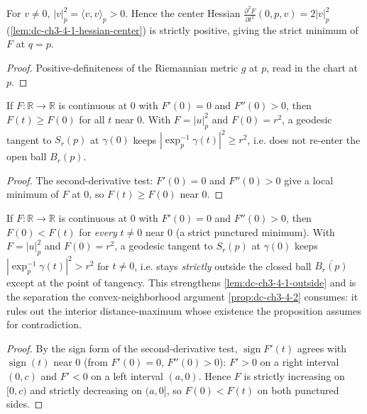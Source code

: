 \begin{lemma}
  \label{lem:dc-ch3-4-1-posdef}
  \leanok
  For $v\neq0$, $|v|_p^2=\langle v,v\rangle_p>0$. Hence the center Hessian
  $\frac{\partial^2 F}{\partial t^2}(0,p,v)=2|v|_p^2$
  (\cref{lem:dc-ch3-4-1-hessian-center}) is strictly positive, giving the
  strict minimum of $F$ at $q=p$.
\end{lemma}
\begin{proof}
  \sketch
  \leanok
  Positive-definiteness of the Riemannian metric $g$ at $p$, read in the chart
  at $p$.
\end{proof}

\begin{lemma}
  \label{lem:dc-ch3-4-1-outside}
  \leanok
  If $F:\mathbb{R}\to\mathbb{R}$ is continuous at $0$ with $F'(0)=0$ and
  $F''(0)>0$, then $F(t)\ge F(0)$ for all $t$ near $0$. With $F=|u|_p^2$ and
  $F(0)=r^2$, a geodesic tangent to $S_r(p)$ at $\gamma(0)$ keeps
  $|\exp_p^{-1}\gamma(t)|^2\ge r^2$, i.e. does not re-enter the open ball
  $B_r(p)$.
\end{lemma}
\begin{proof}
  \sketch
  \leanok
  The second-derivative test: $F'(0)=0$ and $F''(0)>0$ give a local minimum of
  $F$ at $0$, so $F(t)\ge F(0)$ near $0$.
\end{proof}

\begin{lemma}
  \label{lem:dc-ch3-4-1-strict-outside}
  \leanok
  If $F:\mathbb{R}\to\mathbb{R}$ is continuous at $0$ with $F'(0)=0$ and
  $F''(0)>0$, then $F(0)<F(t)$ for \emph{every} $t\neq0$ near $0$ (a strict
  punctured minimum). With $F=|u|_p^2$ and $F(0)=r^2$, a geodesic tangent to
  $S_r(p)$ at $\gamma(0)$ keeps $|\exp_p^{-1}\gamma(t)|^2>r^2$ for $t\neq0$, i.e.
  stays \emph{strictly} outside the closed ball $\overline{B_r(p)}$ except at the
  point of tangency. This strengthens \cref{lem:dc-ch3-4-1-outside} and is the
  separation the convex-neighborhood argument \cref{prop:dc-ch3-4-2}
  consumes: it rules out the interior distance-maximum whose existence the
  proposition assumes for contradiction.
\end{lemma}
\begin{proof}
  \sketch
  \leanok
  By the sign form of the second-derivative test, $\operatorname{sign} F'(t)$
  agrees with $\operatorname{sign}(t)$ near $0$ (from $F'(0)=0$, $F''(0)>0$): $F'>0$
  on a right interval $(0,c)$ and $F'<0$ on a left interval $(a,0)$. Hence $F$ is
  strictly increasing on $[0,c)$ and strictly decreasing on $(a,0]$, so $F(0)<F(t)$
  on both punctured sides.
\end{proof}


